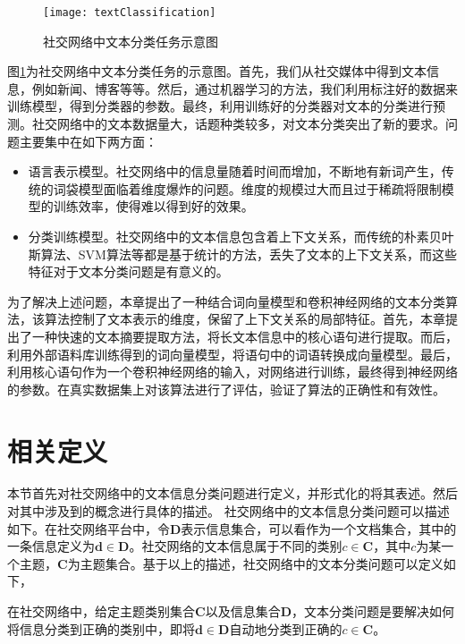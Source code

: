 \begin{figure}[!htbp]
  \centering
  \texttt{[image: textClassification]}
  \caption{社交网络中文本分类任务示意图}
  \label{fig:textClassification}
\end{figure}

图\ref{fig:textClassification}为社交网络中文本分类任务的示意图。首先，我们从社交媒体中得到文本信息，例如新闻、博客等等。然后，通过机器学习的方法，我们利用标注好的数据来训练模型，得到分类器的参数。最终，利用训练好的分类器对文本的分类进行预测。社交网络中的文本数据量大，话题种类较多，对文本分类突出了新的要求。问题主要集中在如下两方面：
\begin{itemize}
  \item 语言表示模型。社交网络中的信息量随着时间而增加，不断地有新词产生，传统的词袋模型面临着维度爆炸的问题。维度的规模过大而且过于稀疏将限制模型的训练效率，使得难以得到好的效果。
  \item 分类训练模型。社交网络中的文本信息包含着上下文关系，而传统的朴素贝叶斯算法、SVM算法等都是基于统计的方法，丢失了文本的上下文关系，而这些特征对于文本分类问题是有意义的。
\end{itemize}

为了解决上述问题，本章提出了一种结合词向量模型和卷积神经网络的文本分类算法，该算法控制了文本表示的维度，保留了上下文关系的局部特征。首先，本章提出了一种快速的文本摘要提取方法，将长文本信息中的核心语句进行提取。而后，利用外部语料库训练得到的词向量模型，将语句中的词语转换成向量模型。最后，利用核心语句作为一个卷积神经网络的输入，对网络进行训练，最终得到神经网络的参数。在真实数据集上对该算法进行了评估，验证了算法的正确性和有效性。

\section{相关定义}
\label{sec3:definition}
本节首先对社交网络中的文本信息分类问题进行定义，并形式化的将其表述。然后对其中涉及到的概念进行具体的描述。
社交网络中的文本信息分类问题可以描述如下。在社交网络平台中，令$\mathbf{D}$表示信息集合，可以看作为一个文档集合，其中的一条信息定义为$\mathbf{d} \in \mathbf{D}$。社交网络的文本信息属于不同的类别$c \in \mathbf{C}$，其中$c$为某一个主题，$\mathbf{C}$为主题集合。基于以上的描述，社交网络中的文本分类问题可以定义如下，
\begin{defn}[文本分类问题]\label{def:textClassification}
在社交网络中，给定主题类别集合$\mathbf{C}$以及信息集合$\mathbf{D}$，文本分类问题是要解决如何将信息分类到正确的类别中，即将$\mathbf{d} \in \mathbf{D}$自动地分类到正确的$c \in \mathbf{C}$。
\end{defn}

